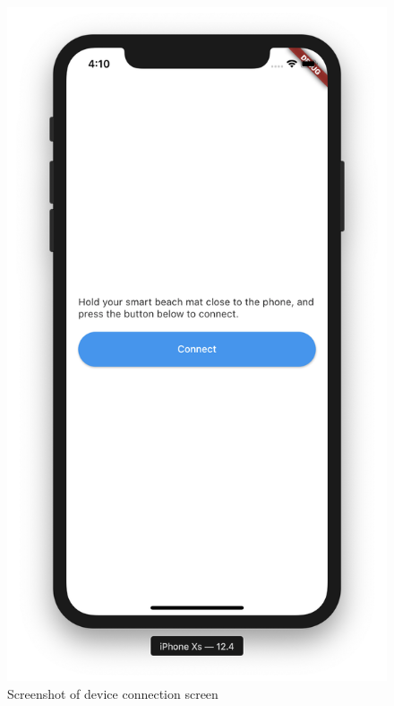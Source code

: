 \documentclass[12pt,openany,a4paper]{book}
\begin{document}
\begin{figure}[h]
	\centering\includegraphics[width=\textwidth]{ConnectScreen.png}
	\caption{Screenshot of device connection screen}
	\label{fig:connect_screen}
	\end{figure}
\end{document}
